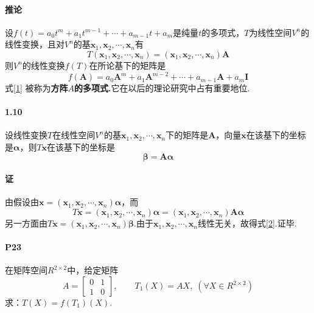 \documentclass[12pt, a4paper, oneside, fontset=none]{ctexart}
\begin{document}
\paragraph*{推论} 设$f(t) = a_0t^m + a_1t^{m - 1} + \cdots + a_{m - 1} t + a_m$是纯量$t$的多项式，$T$为线性空间$V^n$的线性变换，且对$V^n$的基$\bm{x}_1,\bm{x}_2,\cdots,\bm{x}_n$有
\[
    T(\bm{x}_1,\bm{x}_2,\cdots,\bm{x}_n) = (\bm{x}_1,\bm{x}_2,\cdots,\bm{x}_n)\bm{A}
\]
则$V^n$的线性变换$f(T)$在所论基下的矩阵是
\begin{equation*}
    f(\bm{A}) = a_0 \bm{A}^m + a_1 \bm{A}^{m - 2} + \cdots + a_{m - 1} \bm{A} + a_m \bm{I} \tag{1.2.15} \label{1}
\end{equation*}
式\eqref{1} 被称为\textbf{方阵$A$的多项式.}它在以后的理论研究中占有重要地位.

\paragraph*{1.10} 设线性变换$T$在线性空间$V^n$的基$\bm{x}_1,\bm{x}_2,\cdots,\bm{x}_n$下的矩阵是$\bm{A}$，向量$\bm{x}$在该基下的坐标是$\bm{\alpha}$，则$T\bm{x}$在该基下的坐标是
\begin{equation*}
    \bm{\beta} = \bm{A\alpha} \tag{1.2.16} \label{2}
\end{equation*}

\paragraph*{证} 由假设由$\bm{x} = (\bm{x}_1,\bm{x}_2,\cdots,\bm{x}_n) \bm{\alpha}$，而
\[
    T\bm{x} = (\bm{x}_1,\bm{x}_2,\cdots,\bm{x}_n) \bm{\alpha} = (\bm{x}_1,\bm{x}_2,\cdots,\bm{x}_n) \bm{A\alpha}
\]
另一方面由$T\bm{x} = (\bm{x}_1,\bm{x}_2,\cdots,\bm{x}_n) \bm{\beta}.$由于$\bm{x}_1,\bm{x}_2,\cdots,\bm{x}_n$线性无关，故得式\eqref{2}.证毕.

{}

\paragraph*{P23}
在矩阵空间$R^{2\times 2}$中，给定矩阵
\[ A =
    \begin{bmatrix}
        0 & 1 \\
        1 & 0
    \end{bmatrix}, \qquad
    T_1(X) = AX, \; (\forall X \in R^{2\times 2})
\]
求：$T(X) = f(T_1)(X)$.
\end{document}
